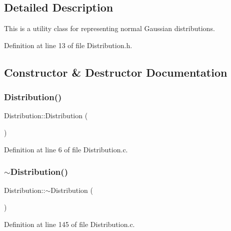 \subsection{Detailed Description}
This is a utility class for representing normal Gaussian distributions. 

Definition at line 13 of file Distribution.\+h.



\subsection{Constructor \& Destructor Documentation}
\mbox{\label{class_world_architect_1_1_distribution_ada837c9a1da728290d6bbea0bb6b266f}} 
\subsubsection{\texorpdfstring{Distribution()}{Distribution()}\hspace{0.1cm}{\footnotesize\ttfamily [1/2]}}
{\footnotesize\ttfamily Distribution\+::\+Distribution (\begin{DoxyParamCaption}{ }\end{DoxyParamCaption})}



Definition at line 6 of file Distribution.\+c.

\mbox{\label{class_world_architect_1_1_distribution_a68522687bdcca605cce35adb68afdcac}} 
\subsubsection{\texorpdfstring{$\sim$Distribution()}{~Distribution()}}
{\footnotesize\ttfamily Distribution\+::$\sim$\+Distribution (\begin{DoxyParamCaption}{ }\end{DoxyParamCaption})}



Definition at line 145 of file Distribution.\+c.

